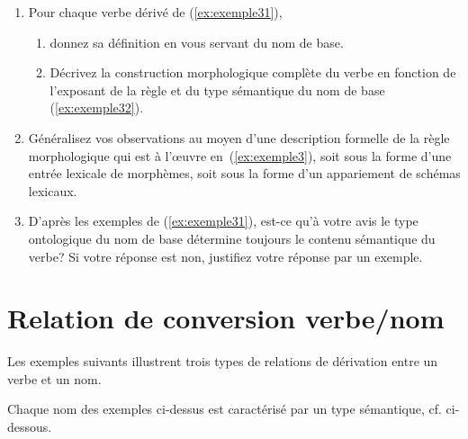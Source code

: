\begin{enumerate}
\item Pour chaque verbe dérivé de (\ref{ex:exemple31}), 
  \begin{enumerate}
  \item donnez sa  définition en vous servant du nom de base.
  \item Décrivez la construction morphologique complète du verbe en fonction de l'exposant de la règle et du type sémantique du nom de base (\ref{ex:exemple32}).
  \end{enumerate}   
\item Généralisez vos observations au moyen d'une description formelle de la règle morphologique qui est à l'œuvre en~(\ref{ex:exemple3}), soit sous la forme d'une entrée lexicale de morphèmes, soit sous la forme d'un appariement de schémas lexicaux.
\item D'après les exemples de (\ref{ex:exemple31}), est-ce qu'à votre avis le type ontologique du nom de base détermine toujours le contenu sémantique du verbe? Si votre réponse est non, justifiez votre réponse par un exemple. 
  
\end{enumerate}

\section{Relation de conversion verbe/nom}

Les exemples suivants illustrent trois types de relations de dérivation entre un verbe et un nom. 

\begin{exe}
  \ex \label{ex:exemple41}
  \begin{xlist}
    \ex \zigzaguerexquatre  
    \ex  \vitriolerexquatre
    \ex \ventriloquerexquatre
  \end{xlist}
\end{exe}

Chaque nom des exemples ci-dessus est caractérisé par un type sémantique, cf. ci-dessous.

\begin{exe}
  \ex \label{ex:exemple42}
  \begin{xlist}
    \ex \zigzagexquatrebis
    \ex \vitriolexquatrebis
    \ex \label{ex:exemple4} \ventriloqueexquatrebis
  \end{xlist}
\end{exe}


